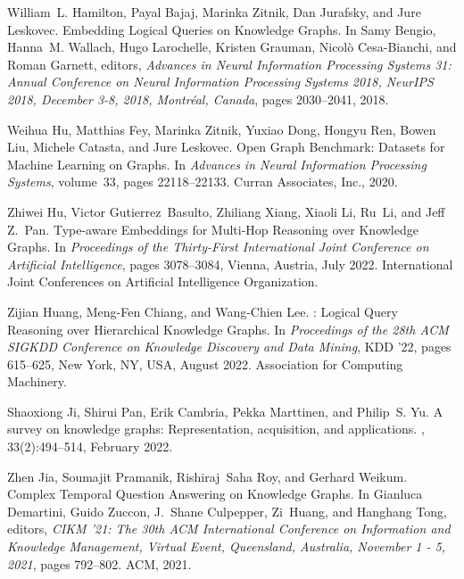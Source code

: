 \documentclass[11pt]{article}
\begin{document}
\begin{thebibliography}{10}
William~L. Hamilton, Payal Bajaj, Marinka Zitnik, Dan Jurafsky, and Jure
  Leskovec.
\newblock Embedding {{Logical Queries}} on {{Knowledge Graphs}}.
\newblock In Samy Bengio, Hanna~M. Wallach, Hugo Larochelle, Kristen Grauman,
  Nicol{\`o} {Cesa-Bianchi}, and Roman Garnett, editors, {\em Advances in
  {{Neural Information Processing Systems}} 31: {{Annual Conference}} on
  {{Neural Information Processing Systems}} 2018, {{NeurIPS}} 2018,
  {{December}} 3-8, 2018, {{Montr\'eal}}, {{Canada}}}, pages 2030--2041, 2018.

Weihua Hu, Matthias Fey, Marinka Zitnik, Yuxiao Dong, Hongyu Ren, Bowen Liu,
  Michele Catasta, and Jure Leskovec.
\newblock Open {{Graph Benchmark}}: {{Datasets}} for {{Machine Learning}} on
  {{Graphs}}.
\newblock In {\em Advances in {{Neural Information Processing Systems}}},
  volume~33, pages 22118--22133. {Curran Associates, Inc.}, 2020.

Zhiwei Hu, Victor Gutierrez~Basulto, Zhiliang Xiang, Xiaoli Li, Ru~Li, and Jeff
  Z.~Pan.
\newblock Type-aware {{Embeddings}} for {{Multi-Hop Reasoning}} over
  {{Knowledge Graphs}}.
\newblock In {\em Proceedings of the {{Thirty-First International Joint
  Conference}} on {{Artificial Intelligence}}}, pages 3078--3084, {Vienna,
  Austria}, July 2022. {International Joint Conferences on Artificial
  Intelligence Organization}.

Zijian Huang, Meng-Fen Chiang, and Wang-Chien Lee.
: {{Logical Query Reasoning}} over {{Hierarchical Knowledge
  Graphs}}.
\newblock In {\em Proceedings of the 28th {{ACM SIGKDD Conference}} on
  {{Knowledge Discovery}} and {{Data Mining}}}, {{KDD}} '22, pages 615--625,
  {New York, NY, USA}, August 2022. {Association for Computing Machinery}.

Shaoxiong Ji, Shirui Pan, Erik Cambria, Pekka Marttinen, and Philip~S. Yu.
\newblock A survey on knowledge graphs: Representation, acquisition, and
  applications.
,
  33(2):494--514, February 2022.

Zhen Jia, Soumajit Pramanik, Rishiraj~Saha Roy, and Gerhard Weikum.
\newblock Complex {{Temporal Question Answering}} on {{Knowledge Graphs}}.
\newblock In Gianluca Demartini, Guido Zuccon, J.~Shane Culpepper, Zi~Huang,
  and Hanghang Tong, editors, {\em {{CIKM}} '21: {{The}} 30th {{ACM
  International Conference}} on {{Information}} and {{Knowledge Management}},
  {{Virtual Event}}, {{Queensland}}, {{Australia}}, {{November}} 1 - 5, 2021},
  pages 792--802. {ACM}, 2021.


\end{thebibliography}
\end{document}
